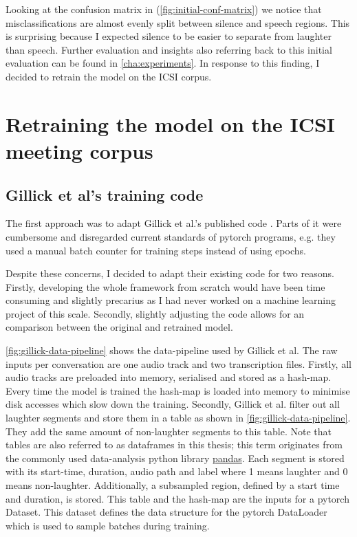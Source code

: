 \documentclass[bsc,frontabs,parskip,deptreport]{infthesis}
\begin{document}
Looking at the confusion matrix in (\autoref{fig:initial-conf-matrix}) we notice that misclassifications are almost evenly split between silence and speech regions. This is surprising because I expected silence to be easier to separate from laughter than speech.
Further evaluation and insights also referring back to this initial evaluation can be found in \autoref{cha:experiments}.
In response to this finding, I decided to retrain the model on the ICSI corpus. 


\chapter{Retraining the model on the ICSI meeting corpus} \label{cha:retraining}
\section{Gillick et al's training code} 
The first approach was to adapt Gillick et al.'s published code \citep{gillick-codebase}. 
Parts of it were cumbersome and disregarded current standards of pytorch programs, e.g. they used a manual batch counter for training steps instead of using epochs.  

Despite these concerns, I decided to adapt their existing code for two reasons.
Firstly, developing the whole framework from scratch would have been time consuming and slightly precarius as I had never worked on a machine learning project of this scale.
Secondly, slightly adjusting the code allows for an comparison between the original and retrained model. 

\autoref{fig:gillick-data-pipeline} shows the data-pipeline used by Gillick et al. The raw inputs per conversation are one audio track and two transcription files. 
Firstly, all audio tracks are preloaded into memory, serialised and stored as a hash-map. Every time the model is trained the hash-map is loaded into memory to minimise disk accesses which slow down the training. 
Secondly, Gillick et al. filter out all laughter segments and store them in a table as shown in \autoref{fig:gillick-data-pipeline}.
They add the same amount of non-laughter segments to this table. 
Note that tables are also referred to as dataframes in this thesis; this term originates from the commonly used data-analysis python library \href{https://pandas.pydata.org/}{pandas}.
Each segment is stored with its start-time, duration, audio path and label where 1 means laughter and 0 means non-laughter. Additionally, a subsampled region, defined by a start time and duration, is stored.
This table and the hash-map are the inputs for a pytorch Dataset. This dataset defines the data structure for the pytorch DataLoader which is used to sample batches during training.
\end{document}
